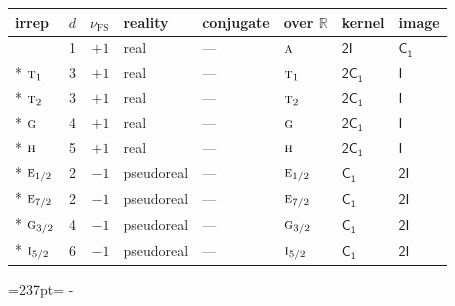 \documentclass[10pt,a4paper]{article}
\makeatletter
\def\grouprule#1#2{\noalign{\marks\LTgroupmarks{\the\belowrulesep}\nobreak\vskip#1%
  \vskip\aboverulesep}\multispan\LT@cols\unskip{\leaders\hrule\@height#2\hfill\kern\z@}\cr
  \noalign{\penalty\LTrulebreak\vskip\belowrulesep\global\@lastruleclass\z@}}
\newcommand{\needspace}[1]{\par\penalty-100\begingroup\dimen0=#1\relax\dimen2=\pagegoal
  \advance\dimen2-\pagetotal\ifdim\dimen0>\dimen2\relax\ifdim\dimen2>0pt\vfil\break\fi\fi
  \endgroup}
\numberwithin{equation}{section}
\newcommand{\grp}[1]{\mathsf{#1}}
\newcommand{\irr}[1]{\text{\normalfont\scshape #1}}
\newcommand{\detbox}[1]{{\setlength{\fboxsep}{1pt}\fbox{#1}}}
\newcommand{\fsind}{\nu_{\mathrm{FS}}}
\makeatother
\begin{document}
\setlength{\emergencystretch}{2em}\par\setlength{\emergencystretch}{0pt}
{\small\renewcommand{\arraystretch}{1.25}\setlength{\tabcolsep}{4pt}\begin{longtable}{@{}lrrlllll@{}}\toprule
irrep & $d$ & $\fsind$ & reality & conjugate & over $\mathbb{R}$ & kernel & image\\\midrule\endhead
\bottomrule\endfoot\endlastfoot
\detbox{$\irr{a}$} & 1 & $+1$ & real & --- & $\irr{a}$ & \href{2I.pdf}{$\grp{2I}$} & \href{../../../rotation/data/pdf/C1.pdf}{$\grp{C_{1}}$}\\*
$\irr{t}_{1}$ & 3 & $+1$ & real & --- & $\irr{t}_{1}$ & \href{2C1.pdf}{$\grp{2C_{1}}$} & \href{../../../rotation/data/pdf/I.pdf}{$\grp{I}$}\\*
$\irr{t}_{2}$ & 3 & $+1$ & real & --- & $\irr{t}_{2}$ & \href{2C1.pdf}{$\grp{2C_{1}}$} & \href{../../../rotation/data/pdf/I.pdf}{$\grp{I}$}\\*
$\irr{g}$ & 4 & $+1$ & real & --- & $\irr{g}$ & \href{2C1.pdf}{$\grp{2C_{1}}$} & \href{../../../rotation/data/pdf/I.pdf}{$\grp{I}$}\\*
$\irr{h}$ & 5 & $+1$ & real & --- & $\irr{h}$ & \href{2C1.pdf}{$\grp{2C_{1}}$} & \href{../../../rotation/data/pdf/I.pdf}{$\grp{I}$}\\*
\grouprule{0pt}{\lightrulewidth}
$\irr{e}_{1/2}$ & 2 & $-1$ & pseudoreal & --- & $\irr{e}_{1/2}$ & \href{C1.pdf}{$\grp{C_{1}}$} & \href{2I.pdf}{$\grp{2I}$}\\*
$\irr{e}_{7/2}$ & 2 & $-1$ & pseudoreal & --- & $\irr{e}_{7/2}$ & \href{C1.pdf}{$\grp{C_{1}}$} & \href{2I.pdf}{$\grp{2I}$}\\*
$\irr{g}_{3/2}$ & 4 & $-1$ & pseudoreal & --- & $\irr{g}_{3/2}$ & \href{C1.pdf}{$\grp{C_{1}}$} & \href{2I.pdf}{$\grp{2I}$}\\*
$\irr{i}_{5/2}$ & 6 & $-1$ & pseudoreal & --- & $\irr{i}_{5/2}$ & \href{C1.pdf}{$\grp{C_{1}}$} & \href{2I.pdf}{$\grp{2I}$}\\
\bottomrule\end{longtable}}
\needspace{237pt}
\end{document}
